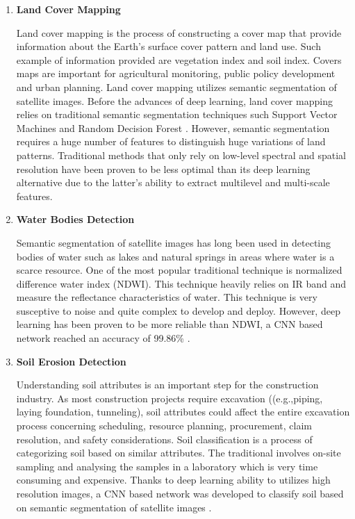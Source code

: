 \begin{enumerate}
    \item \textbf{Land Cover Mapping}
    
    Land cover mapping is the process of constructing a cover map that provide information about the Earth's surface cover pattern and land use. Such example of information provided are vegetation index and soil index. Covers maps are important for agricultural monitoring, public policy development and urban planning. Land cover mapping utilizes semantic segmentation of satellite images. Before the advances of deep learning, land cover mapping relies on traditional semantic segmentation techniques such Support Vector Machines and Random Decision Forest \cite{DBLP:journals/corr/Thoma16a}. However, semantic segmentation requires a huge number of features to distinguish huge variations of land patterns. Traditional methods that only rely on low-level spectral and spatial resolution have been proven to be less optimal than its  deep learning alternative due to the latter's ability to extract multilevel and multi-scale features\cite{Yuan2020DeepLI}. 
    
    \item \textbf{Water Bodies Detection}

    Semantic segmentation of satellite images has long been used in detecting bodies of water such as lakes and natural springs in areas where water is a scarce resource. One of the most popular traditional technique is normalized difference water index (NDWI). This technique heavily relies on IR band and measure the reflectance characteristics of water. This technique is very susceptive to noise and quite complex to develop and deploy. However, deep learning has been proven to be more reliable than NDWI, a CNN based network reached an accuracy of 99.86\% \cite{edseee.864274320181101}.
    
    \item \textbf{Soil Erosion Detection}
    
    Understanding soil attributes is an important step for the construction industry. As most construction projects require excavation ((e.g.,piping, laying foundation, tunneling), soil attributes could affect the entire excavation process concerning scheduling, resource planning, procurement, claim resolution, and safety considerations. Soil classification is a process of categorizing soil based on similar attributes. The traditional involves on-site sampling and analysing the samples in a laboratory which is very time consuming and expensive. Thanks to deep learning ability to utilizes high resolution images, a CNN based network was developed to classify soil based on semantic segmentation of satellite images \cite{9554290}. 
    

\end{enumerate}
